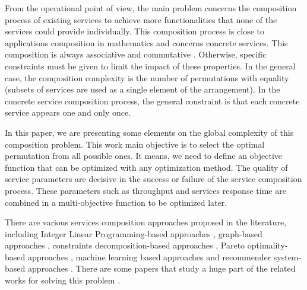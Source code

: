 \documentclass[10pt,journal,compsoc]{IEEEtran}
\begin{document}

From the operational point of view, the main problem concerns the composition process of existing services to achieve more functionalities that none of the services could provide individually. This composition process is close to applications composition in mathematics and concerns concrete services. This composition is always associative and commutative \cite{GABREL2015}. Otherwise, specific constraints must be given to limit the impact of these properties. In the general case, the composition complexity is the number of permutations with equality (subsets of services are used as a single element of the arrangement). In the concrete service composition process, the general constraint is that each concrete service appears one and only once. 

In this paper, we are presenting some elements on the global complexity of this composition problem. This work main objective is to select the optimal permutation from all possible ones. It means, we need to define an objective function that can be optimized with any optimization method. The quality of service parameters are decisive in the success or failure of the service composition process. These parameters such as throughput and services response time are combined in a multi-objective function to be optimized later. 

There are various services composition approaches proposed in the literature, including Integer Linear Programming-based approaches \cite{zeng2004qos, zeng2003quality, cardellini2007flow}, graph-based approaches \cite{yu2007efficient, llinas2015network, da2014graph, Rodriguez2016}, constraints decomposition-based approaches \cite{alrifai2012hybrid}, Pareto optimality-based approaches \cite{khanouche2016energy, yu2013efficient, wang2017service}, machine learning based approaches \cite{Mostafa2015, Deng2016s, Deng2016m, Rao2011, mabrouk2015set} and recommender system-based approaches \cite{Manikrao2005, Liu2005, chen2014web}. There are some papers that study a huge part of the related works for solving this problem \cite{khanouche2016energy, Zheng2015}. 
\end{document}
